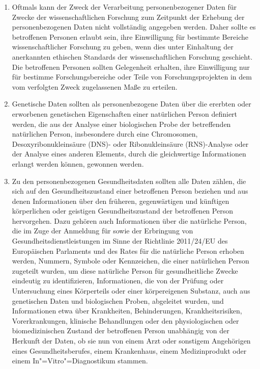 \begin{enumerate}

   \item Oftmals kann der Zweck der Verarbeitung personenbezogener Daten für Zwecke der wissenschaftlichen Forschung zum
    Zeitpunkt der Erhebung der personenbezogenen Daten nicht vollständig angegeben werden. Daher sollte es betroffenen
    Personen erlaubt sein, ihre Einwilligung für bestimmte Bereiche wissenschaftlicher Forschung zu geben, wenn dies
    unter Einhaltung der anerkannten ethischen Standards der wissenschaftlichen Forschung geschieht. Die betroffenen
    Personen sollten Gelegenheit erhalten, ihre Einwilligung nur für bestimme Forschungsbereiche oder Teile von
    Forschungsprojekten in dem vom verfolgten Zweck zugelassenen Maße zu erteilen.%
   \label{eg:33}
   

   \item Genetische Daten sollten als personenbezogene Daten über die ererbten oder erworbenen genetischen Eigenschaften
    einer natürlichen Person definiert werden, die aus der Analyse einer biologischen Probe der betreffenden
    natürlichen Person, insbesondere durch eine Chromosomen, Desoxyribonukleinsäure (DNS)- oder Ribonukleinsäure
    (RNS)-Analyse oder der Analyse eines anderen Elements, durch die gleichwertige Informationen erlangt werden können,
    gewonnen werden.%
   \label{eg:34}
   

   \item Zu den personenbezogenen Gesundheitsdaten sollten alle Daten zählen, die sich auf den Gesundheitszustand einer
    betroffenen Person beziehen und aus denen Informationen über den früheren, gegenwärtigen und künftigen körperlichen
    oder geistigen Gesundheitszustand der betroffenen Person hervorgehen. Dazu gehören auch Informationen über die
    natürliche Person, die im Zuge der Anmeldung für sowie der Erbringung von Gesundheitsdienstleistungen im Sinne der
    Richtlinie 2011/24/EU des Europäischen Parlaments und des Rates für die natürliche Person erhoben werden, Nummern, Symbole
    oder Kennzeichen, die einer natürlichen Person zugeteilt wurden, um diese natürliche Person für gesundheitliche
    Zwecke eindeutig zu identifizieren, Informationen, die von der Prüfung oder Untersuchung eines Körperteils oder
    einer körpereigenen Substanz, auch aus genetischen Daten und biologischen Proben, abgeleitet wurden, und
    Informationen etwa über Krankheiten, Behinderungen, Krankheitsrisiken, Vorerkrankungen, klinische Behandlungen oder
    den physiologischen oder biomedizinischen Zustand der betroffenen Person unabhängig von der Herkunft der Daten, ob
    sie nun von einem Arzt oder sonstigem Angehörigen eines Gesundheitsberufes, einem Krankenhaus, einem Medizinprodukt
    oder einem In"=Vitro"=Diagnostikum stammen.%
   \label{eg:35}
   

\end{enumerate}
